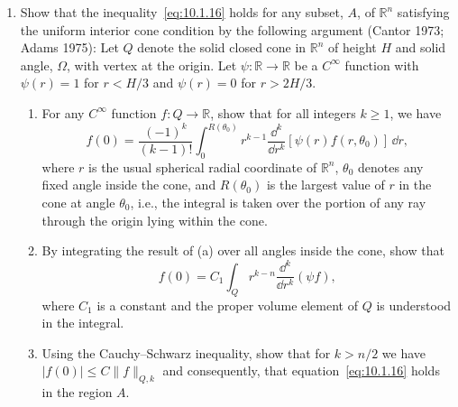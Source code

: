 
\chapterproblems

\begin{enumerate}[label=\arabic*.,leftmargin=*,itemsep=1em]
\item Show that the inequality~\eqref{eq:10.1.16} holds for any subset, \(A\), of
\(\mathbb R^n\) satisfying the uniform interior cone condition by the following
argument (Cantor 1973; Adams 1975): Let \(Q\) denote the solid closed cone in
\(\mathbb R^n\) of height \(H\) and solid angle, \(\Omega\), with vertex at the origin.
Let \(\psi:\mathbb R\to\mathbb R\) be a \(C^\infty\) function with \(\psi(r)=1\) for
\(r<H/3\) and \(\psi(r)=0\) for \(r>2H/3\).
  \begin{enumerate}[label=\alph*),leftmargin=2.2em,itemsep=.45em]
  \item For any \(C^\infty\) function \(f:Q\to\mathbb R\), show that for all integers
  \(k\geq1\), we have
  \[
    f(0)=\frac{(-1)^k}{(k-1)!}
      \int_0^{R(\theta_0)}r^{k-1}
      \frac{\dd^k}{\dd r^k}[\psi(r)f(r,\theta_0)]\,\dd r,
  \]
  where \(r\) is the usual spherical radial coordinate of \(\mathbb R^n\), \(\theta_0\)
  denotes any fixed angle inside the cone, and \(R(\theta_0)\) is the largest value of
  \(r\) in the cone at angle \(\theta_0\), i.e., the integral is taken over the portion
  of any ray through the origin lying within the cone.

  \item By integrating the result of (a) over all angles inside the cone, show that
  \[
    f(0)=C_1\int_Q r^{k-n}\frac{\dd^k}{\dd r^k}(\psi f),
  \]
  where \(C_1\) is a constant and the proper volume element of \(Q\) is understood
  in the integral.

  \item Using the Cauchy--Schwarz inequality, show that for \(k>n/2\) we have
  \(|f(0)|\leq C\lVert f\rVert_{Q,k}\) and consequently, that
  equation~\eqref{eq:10.1.16} holds in the region \(A\).
  \end{enumerate}


\end{enumerate}
